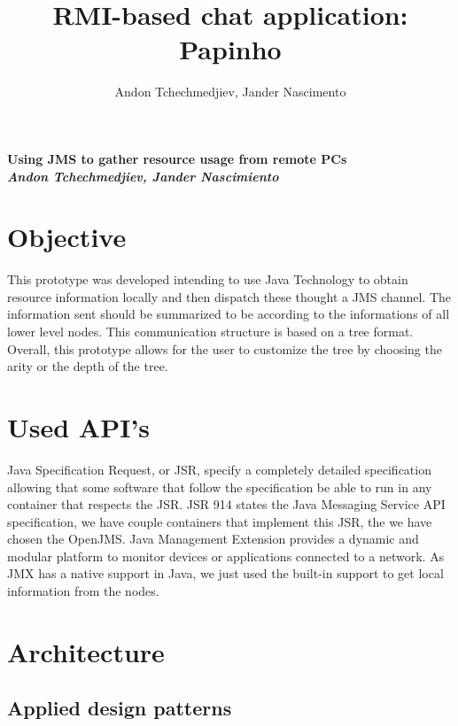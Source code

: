 \documentclass[times, 8pt,twocolumn]{article}
\title {RMI-based chat application: Papinho}
\author{Andon Tchechmedjiev, Jander Nascimento}
\begin{document}
{\Large {\bf Using JMS to gather resource usage from remote PCs}} \\
{\large {\bf {\it Andon Tchechmedjiev, Jander Nascimiento}}}
\section{Objective}
This prototype was developed intending to use Java Technology to obtain resource information locally and then dispatch these thought a JMS channel.
The information sent should be summarized to be according to the informations of all lower level nodes.
This communication structure is based on a tree format.
Overall, this prototype allows for the user to customize the tree by choosing the arity or the depth of the tree.

\section{Used API's}

Java Specification Request, or JSR, specify a completely detailed specification allowing that some software that follow the specification be able to run in any container that respects the JSR.
JSR 914 states the Java Messaging Service API specification, we have couple containers that implement this JSR, the we have chosen the OpenJMS.
Java Management Extension provides a dynamic and modular platform to monitor devices or applications connected to a network.
As JMX has a native support in Java, we just used the built-in support to get local information from the nodes. 

\section{Architecture}
\subsection{Applied design patterns}
\end{document}
